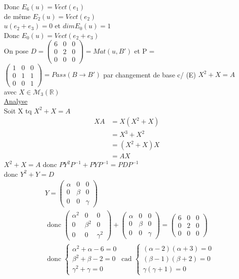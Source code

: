 \documentclass{article}
\begin{document}
Donc \(E_6(u) = Vect(e_1)\)\\
de même \(E_2(u) = Vect(e_2)\)\\
\(u(e_2 + e_3) = 0\) et \(dimE_0(u) = 1\)\\
Donc \(E_0(u) = Vect(e_2 + e_3)\)\\
On pose \(D = \begin{pmatrix}
    6 & 0&0\\0&2&0\\0&0&0
\end{pmatrix} = Mat(u, B')\) et P = \(\begin{pmatrix}
    1&0&0\\0&1&1\\0&0&1
\end{pmatrix} = Pass(B \to B')\) par changement de base 
c/ (E) \(X^2+X=A\) avec \(X \in \mathcal{M}_3(\mathbb{R})\)\\
\underline{Analyse}\\
Soit X tq \(X^2 + X = A\) \begin{align*}
    XA &= X(X^2 + X)\\
    &= X^3 + X^2\\
    &= (X^2 + X)X\\
    &= AX
\end{align*}
\(X^2 + X = A\) donc \(PY^2P^{-1} + PYP^{-1} = PDP^{-1}\)\\
donc \(Y^2 + Y = D\)
\begin{align*}
    &Y = \begin{pmatrix}
        \alpha & 0 & 0\\ 0& \beta  & 0 \\ 0& 0 & \gamma
    \end{pmatrix}\\
    &\text{ donc } \begin{pmatrix}
        \alpha^2 & 0 & 0\\ 0& \beta^2  & 0 \\ 0& 0 & \gamma^2
    \end{pmatrix} + \begin{pmatrix}
        \alpha & 0 & 0\\ 0& \beta  & 0 \\ 0& 0 & \gamma
    \end{pmatrix} = \begin{pmatrix}
        6 & 0 & 0\\ 0& 2  & 0 \\ 0& 0 & 0
    \end{pmatrix}\\
    &\text{ donc } \begin{cases}
        \alpha^2 + \alpha - 6 = 0\\
        \beta^2 + \beta - 2 = 0\\
        \gamma^2 + \gamma = 0
    \end{cases} \text{ cad } \begin{cases}
        (\alpha-2)(\alpha+3) = 0 \\
        (\beta-1)(\beta + 2) = 0\\
        \gamma(\gamma+1) = 0
    \end{cases}
\end{align*}
\end{document}
